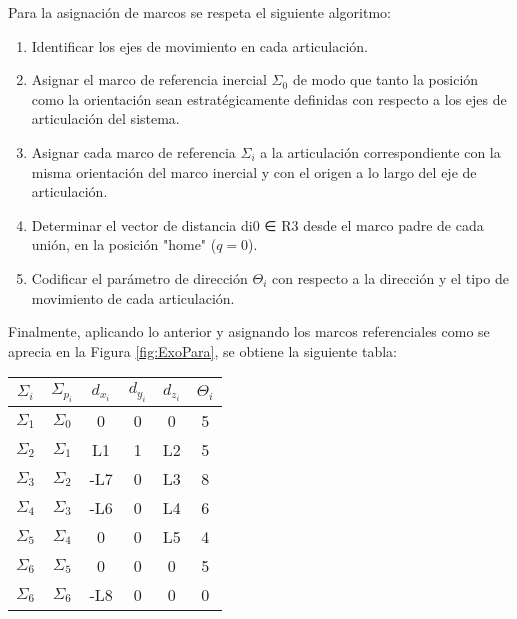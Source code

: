     Para la asignación de marcos se respeta el siguiente algoritmo:
    \begin{enumerate}
    \item Identificar los ejes de movimiento en cada articulación.
    \item Asignar el marco de referencia inercial $\Sigma_0$ de modo que tanto la posición como la orientación sean
    estratégicamente definidas con respecto a los ejes de articulación del sistema.
    \item Asignar cada marco de referencia $\Sigma_i$ a la articulación correspondiente con la misma orientación del
    marco inercial y con el origen a lo largo del eje de articulación.
    \item Determinar el vector de distancia di0 ∈ R3 desde el marco padre de cada unión, en la posición "home" ($q = 0$).
    \item Codificar el parámetro de dirección $\Theta _i$ con respecto a la dirección y el tipo de movimiento de cada
    articulación.
    
    \end{enumerate}

    \noindent Finalmente, aplicando lo anterior y asignando los marcos referenciales como se aprecia en la Figura
    \ref{fig:ExoPara}, se obtiene la siguiente tabla:

    \begin{table}[!ht] %
    \centering
    \begin{center}
    \begin{tabular}{cccccc}
    $\Sigma_i$ & $\Sigma_{p_i}$ & $d_{x_i}$ & $d_{y_i}$ & $d_{z_i}$ & $\Theta_i$\\
    \hline \hline 
    $\Sigma_1$ & $\Sigma_0$ & 0   & 0 & 0  & 5\\ 
    $\Sigma_2$ & $\Sigma_1$ & L1  & 1 & L2 & 5\\
    $\Sigma_3$ & $\Sigma_2$ & -L7 & 0 & L3 & 8\\
    $\Sigma_4$ & $\Sigma_3$ & -L6 & 0 & L4 & 6\\
    $\Sigma_5$ & $\Sigma_4$ & 0   & 0 & L5 & 4\\
    $\Sigma_6$ & $\Sigma_5$ & 0   & 0 & 0  & 5\\
    $\Sigma_6$ & $\Sigma_6$ & -L8 & 0 & 0  & 0\\
    \end{tabular}
    \end{center}
    \end{table}
